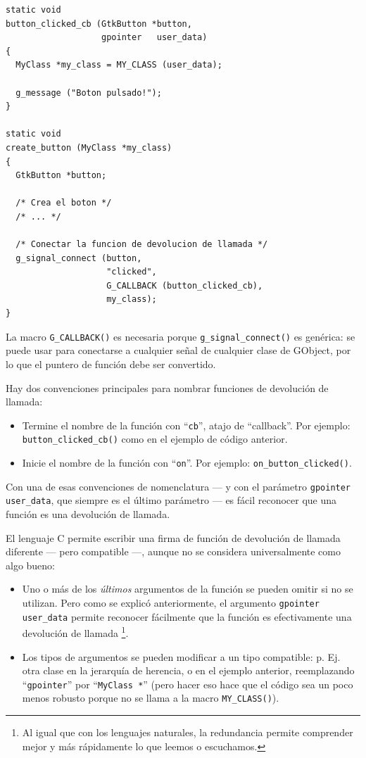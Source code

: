 \begin{lstlisting}[style=GLib/GTK, caption={Cómo conectarse a una señal}, label=oop-gobject-connect-to-signal]
static void
button_clicked_cb (GtkButton *button,
                   gpointer   user_data)
{
  MyClass *my_class = MY_CLASS (user_data);

  g_message ("Boton pulsado!");
}

static void
create_button (MyClass *my_class)
{
  GtkButton *button;

  /* Crea el boton */
  /* ... */

  /* Conectar la funcion de devolucion de llamada */
  g_signal_connect (button,
                    "clicked",
                    G_CALLBACK (button_clicked_cb),
                    my_class);
}
\end{lstlisting}

La macro \lstinline{G_CALLBACK()} es necesaria porque \lstinline{g_signal_connect()} es genérica: se puede usar para conectarse a cualquier señal de cualquier clase de GObject, por lo que el puntero de función debe ser convertido.

Hay dos convenciones principales para nombrar funciones de devolución de llamada:
\begin{itemize}
  \item Termine el nombre de la función con ``\lstinline{cb}'', atajo de ``callback''. Por ejemplo: \lstinline{button_clicked_cb()} como en el ejemplo de código anterior.
  \item Inicie el nombre de la función con ``\lstinline{on}''. Por ejemplo: \lstinline{on_button_clicked()}.
\end{itemize}

Con una de esas convenciones de nomenclatura --- y con el parámetro \lstinline{gpointer user_data}, que siempre es el último parámetro --- es fácil reconocer que una función es una devolución de llamada.

El lenguaje C permite escribir una firma de función de devolución de llamada diferente --- pero compatible ---, aunque no se considera universalmente como algo bueno:
\begin{itemize}
  \item Uno o más de los \emph{últimos} argumentos de la función se pueden omitir si no se utilizan. Pero como se explicó anteriormente, el argumento \lstinline{gpointer user_data} permite reconocer fácilmente que la función es efectivamente una devolución de llamada \footnote{Al igual que con los lenguajes naturales, la redundancia permite comprender mejor y más rápidamente lo que leemos o escuchamos.}.
  \item Los tipos de argumentos se pueden modificar a un tipo compatible: p. Ej. otra clase en la jerarquía de herencia, o en el ejemplo anterior, reemplazando ``\lstinline{gpointer}'' por ``\lstinline{MyClass *}'' (pero hacer eso hace que el código sea un poco menos robusto porque no se llama a la macro \lstinline{MY_CLASS()}).
\end{itemize}

